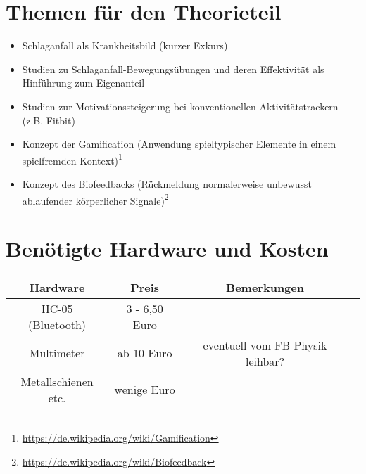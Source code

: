 \documentclass[a4paper, 11pt, titlepage, bibliography=totocnumbered,landscape]{scrartcl}
\begin{document}
\begin{multicols*}{2}
\section{Themen für den Theorieteil}
\begin{itemize}
\item Schlaganfall als Krankheitsbild (kurzer Exkurs)
\item Studien zu Schlaganfall-Bewegungsübungen und deren Effektivität als Hinführung zum Eigenanteil
\item Studien zur Motivationssteigerung bei konventionellen Aktivitätstrackern (z.B. Fitbit)
\item Konzept der Gamification (Anwendung spiel­typischer Elemente in einem spielfremden Kontext)\footnote{\url{https://de.wikipedia.org/wiki/Gamification}}
\item Konzept des Biofeedbacks (Rückmeldung normalerweise unbewusst ablaufender körperlicher Signale)\footnote{\url{https://de.wikipedia.org/wiki/Biofeedback}}
\end{itemize}
\section{Benötigte Hardware und Kosten}
\begin{tabular}{|c|c|c|c|}
\hline
	\textbf{Hardware} & \textbf{Preis} & \textbf{Bemerkungen}\\ \hline
	HC-05 (Bluetooth) & 3 - 6,50 Euro & \\ \hline
	Multimeter & ab 10 Euro & eventuell vom FB Physik leihbar? \\ \hline
	Metallschienen etc. & wenige Euro & \\ \hline
\end{tabular}
\end{multicols*}
\end{document}
